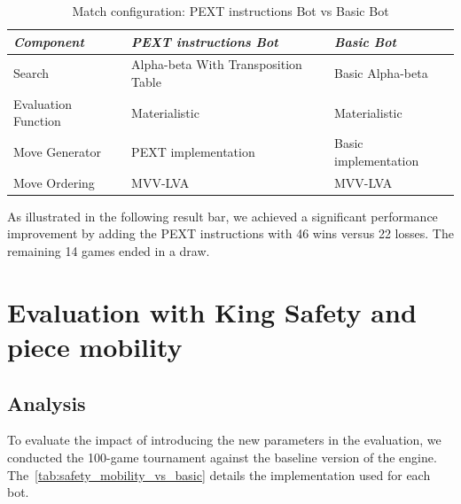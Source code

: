 \begin{table}
    \centering
    \begin{tabular}{|p{4cm}|p{4cm}|p{4cm}|}
    \hline
    \textit{Component}         & \textit{PEXT instructions Bot}  & \textit{Basic Bot}     \\ \hline
    Search                     & Alpha-beta With Transposition Table          & Basic Alpha-beta           \\ \hline
    Evaluation Function        & Materialistic                      & Materialistic       \\ \hline
    Move Generator             & PEXT implementation              & Basic implementation   \\ \hline
    Move Ordering              & MVV-LVA                           & MVV-LVA                \\ \hline
    \end{tabular}
    \caption{Match configuration: PEXT instructions Bot vs Basic Bot}\label{tab:pext_vs_basic}
\end{table}

\noindent As illustrated in the following result bar, we achieved a significant performance improvement by adding the PEXT instructions with 46 wins versus 22 losses. The remaining 14 games ended in a draw.

\begin{center}
\medskip
\end{center}

\section{Evaluation with King Safety and piece mobility}

\subsection{Analysis}

To evaluate the impact of introducing the new parameters in the evaluation, we conducted the 100-game tournament against the baseline version of the engine. The~\cref{tab:safety_mobility_vs_basic} details the implementation used for each bot.

\vspace{1em}

